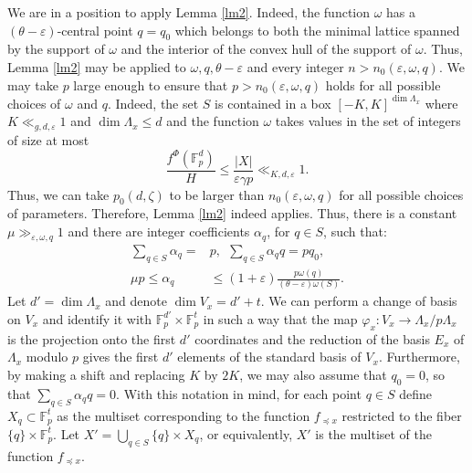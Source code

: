 \documentclass{daj}
\renewcommand{\le}{\leqslant}
\newcommand{\FF}{\mathbb F}
\theoremstyle{definition}
\theoremstyle{remark}
\theoremstyle{definition}
\theoremstyle{definition}
\begin{document}
We are in a position to apply Lemma \ref{lm2}. Indeed, the function $\omega$ has a $(\theta-\varepsilon)$-central point $q=q_0$ which belongs to both the minimal lattice spanned by the support of $\omega$ and the interior of the convex hull of the support of $\omega$. Thus, Lemma \ref{lm2} may be applied to $\omega, q, \theta-\varepsilon$ and every integer $n > n_0(\varepsilon, \omega, q)$.
We may take $p$ large enough to ensure that $p > n_0(\varepsilon, \omega, q)$ holds for all possible choices of $\omega$ and $q$. Indeed, the set $S$ is contained in a box $[-K, K]^{\dim \Lambda_x}$ where $K \ll_{g, d, \varepsilon} 1$ and $\dim \Lambda_x \le d$ and the function $\omega$ takes values in the set of integers of size at most 
$$
\frac{f^\Phi(\FF_p^d)}{H} \le \frac{|X|}{\varepsilon \gamma p} \ll_{K, d, \varepsilon} 1.
$$
Thus, we can take $p_0(d, \zeta)$ to be larger than $n_0(\varepsilon, \omega,  q)$ for all possible choices of parameters. Therefore, Lemma \ref{lm2} indeed applies. Thus, there is a constant $\mu \gg_{\varepsilon, \omega, q} 1$ and there are integer coefficients $\alpha_q$, for $q \in S$, such that:
\begin{align}
    \sum_{q\in S} \alpha_q =& p, ~~ \sum_{q\in S} \alpha_q q = p q_0,\\
    \mu p \le \alpha_q& \le (1+\varepsilon) \frac{p \omega(q)}{(\theta-\varepsilon) \omega(S)}.\label{alphaq}
\end{align}
Let $d' = \dim \Lambda_x$ and denote $\dim V_x = d' + t$. We can perform a change of basis on $V_x$ and identify it with $\FF_p^{d'} \times \FF_p^t$ in such a way that the map $\varphi_x: V_x \rightarrow \Lambda_x/p\Lambda_x$ is the projection onto the first $d'$ coordinates and the reduction of the basis $E_x$ of $\Lambda_x$ modulo $p$ gives the first $d'$ elements of the standard basis of $V_x$. Furthermore, by making a shift and replacing $K$ by $2K$, we may also assume that $q_0 = 0$, so that $\sum_{q \in S} \alpha_q q = 0$.
With this notation in mind, for each point $q \in S$ define $X_q \subset \FF_p^t$ as the multiset corresponding to the function $f_{\preceq x}$ restricted to the fiber $\{q\}\times \FF_p^t$. Let $X' = \bigcup_{q \in S} \{q\} \times X_q$, or equivalently, $X'$ is the multiset of the function $f_{\preceq x}$.
\end{document}
